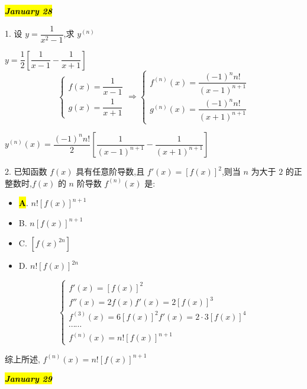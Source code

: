 \hl{\textbf{\textit{January 28}}}

1. 设 $y=\dfrac{1}{x^{2}-1}$,求 $y^{(n)}$
\begin{solution}

	$y = \dfrac{1}{2}\left[\dfrac{1}{x-1}-\dfrac{1}{x+1}\right]$
	$$\begin{cases} 
	f(x) = \dfrac{1}{x-1}\\
	g(x) =\dfrac{1}{x+1}
	\end{cases}\Rightarrow 
	\begin{cases}
	f^{(n)}(x) = \dfrac{(-1)^{n}n!}{(x-1)^{n+1}}\\
	g^{(n)}(x) = \dfrac{(-1)^{n}n!}{(x+1)^{n+1}}
	\end{cases}$$
	
	$y^{(n)}(x) = \dfrac{(-1)^{n}n!}{2}\left[\dfrac{1}{(x-1)^{n+1}}-\dfrac{1}{(x+1)^{n+1}}\right]$
\end{solution}

2. 已知函数 $f(x)$ 具有任意阶导数,且 $f'(x)=[f(x)]^{2}$,则当 $n$ 为大于 $2$ 的正整数时,$f(x)$ 的 $n$ 阶导数 $f^{(n)}(x)$ 是:
\begin{itemize}
	\item \hl{\textbf{A}}. $n![f(x)]^{n+1}$
	\item B. $n[f(x)]^{n+1}$
	\item C. $[f(x)^{2n}]$
	\item D. $n![f(x)]^{2n}$
\end{itemize}
\begin{solution}

	$$\begin{cases}
	f'(x) = [f(x)]^{2}\\
	f''(x) = 2f(x)f'(x) = 2[f(x)]^{3}\\
	f^{(3)}(x) = 6[f(x)]^{2}f'(x) = 2\cdot 3[f(x)]^{4}\\
	\cdots\cdots\\
	f^{(n)}(x) = n![f(x)]^{n+1} 
	\end{cases}$$

	综上所述, $f^{(n)}(x) = n![f(x)]^{n+1}$
\end{solution}

\hl{\textbf{\textit{January 29}}}

